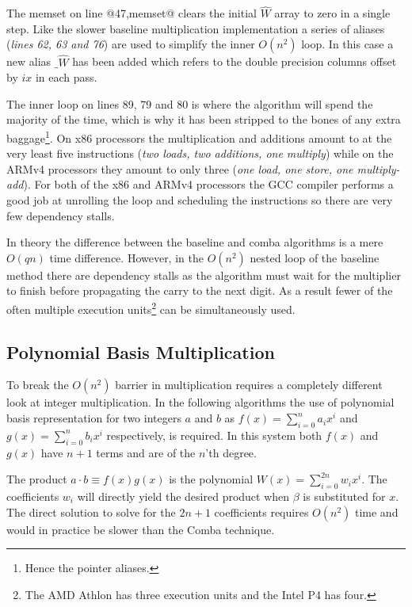 \documentclass[b5paper]{book}
\begin{document}
The memset on line @47,memset@ clears the initial $\hat W$ array to zero in a single step. Like the slower baseline multiplication
implementation a series of aliases (\textit{lines 62, 63 and 76}) are used to simplify the inner $O(n^2)$ loop.  
In this case a new alias $\_\hat W$ has been added which refers to the double precision columns offset by $ix$ in each pass.  

The inner loop on lines 89, 79 and 80 is where the algorithm will spend the majority of the time, which is why it has been 
stripped to the bones of any extra baggage\footnote{Hence the pointer aliases.}.  On x86 processors the multiplication and additions amount to at the 
very least five instructions (\textit{two loads, two additions, one multiply}) while on the ARMv4 processors they amount to only three 
(\textit{one load, one store, one multiply-add}).   For both of the x86 and ARMv4 processors the GCC compiler performs a good job at unrolling the loop 
and scheduling the instructions so there are very few dependency stalls.

In theory the difference between the baseline and comba algorithms is a mere $O(qn)$ time difference.  However, in the $O(n^2)$ nested loop of the
baseline method there are dependency stalls as the algorithm must wait for the multiplier to finish before propagating the carry to the next 
digit.  As a result fewer of the often multiple execution units\footnote{The AMD Athlon has three execution units and the Intel P4 has four.} can
be simultaneously used.  

\subsection{Polynomial Basis Multiplication}
To break the $O(n^2)$ barrier in multiplication requires a completely different look at integer multiplication.  In the following algorithms
the use of polynomial basis representation for two integers $a$ and $b$ as $f(x) = \sum_{i=0}^{n} a_i x^i$ and  
$g(x) = \sum_{i=0}^{n} b_i x^i$ respectively, is required.  In this system both $f(x)$ and $g(x)$ have $n + 1$ terms and are of the $n$'th degree.
 
The product $a \cdot b \equiv f(x)g(x)$ is the polynomial $W(x) = \sum_{i=0}^{2n} w_i x^i$.  The coefficients $w_i$ will
directly yield the desired product when $\beta$ is substituted for $x$.  The direct solution to solve for the $2n + 1$ coefficients
requires $O(n^2)$ time and would in practice be slower than the Comba technique.
\end{document}
